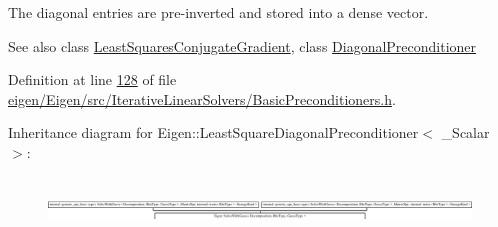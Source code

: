 The diagonal entries are pre-\/inverted and stored into a dense vector.

\begin{DoxySeeAlso}{See also}
class \hyperlink{group___iterative_linear_solvers___module_class_eigen_1_1_least_squares_conjugate_gradient}{Least\+Squares\+Conjugate\+Gradient}, class \hyperlink{group___iterative_linear_solvers___module_class_eigen_1_1_diagonal_preconditioner}{Diagonal\+Preconditioner} 
\end{DoxySeeAlso}


Definition at line \hyperlink{eigen_2_eigen_2src_2_iterative_linear_solvers_2_basic_preconditioners_8h_source_l00128}{128} of file \hyperlink{eigen_2_eigen_2src_2_iterative_linear_solvers_2_basic_preconditioners_8h_source}{eigen/\+Eigen/src/\+Iterative\+Linear\+Solvers/\+Basic\+Preconditioners.\+h}.

Inheritance diagram for Eigen\+:\+:Least\+Square\+Diagonal\+Preconditioner$<$ \+\_\+\+Scalar $>$\+:\begin{figure}[H]
\begin{center}
\leavevmode
\includegraphics[height=1.702128cm]{group___iterative_linear_solvers___module}
\end{center}
\end{figure}
